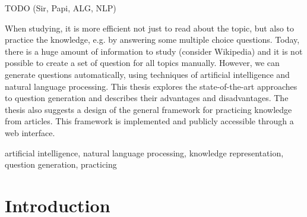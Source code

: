 \documentclass[a4paper, 12pt, twoside]{fithesis2}		%
\renewcommand{\_}{\leavevmode \kern0.0em\vbox{\hrule width0.4em}}
\begin{document}
\FrontMatter
\ThesisTitlePage

\begin{ThesisDeclaration}
\DeclarationText
\AdvisorName
\end{ThesisDeclaration}

\begin{ThesisThanks}

  TODO (Sir, Papi, ALG, NLP)


\end{ThesisThanks}

\begin{ThesisAbstract}
When studying, it is more efficient not just to read about the topic, but also to practice the knowledge, e.g. by answering some multiple choice questions. Today, there is a huge amount of information to study (consider Wikipedia) and it is not possible to create a set of question for all topics manually. However, we can generate questions automatically, using techniques of artificial intelligence and natural language processing. This thesis explores the state-of-the-art approaches to question generation and describes their advantages and disadvantages. The thesis also suggests a design of the general framework for practicing knowledge from articles. This framework is implemented and publicly accessible through a web interface.
\end{ThesisAbstract}

\begin{ThesisKeyWords}
artificial intelligence, natural language processing,
knowledge representation, question generation, practicing
\end{ThesisKeyWords}

\MainMatter
\tableofcontents

\chapter{Introduction}
\label{chap:intro}
\end{document}
